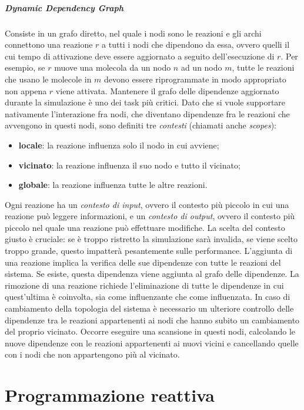 \documentclass[12pt,a4paper,openright,twoside]{book}
\begin{document}
\paragraph{Dynamic Dependency Graph}
Consiste in un grafo diretto, nel quale i nodi sono le reazioni e gli archi connettono una reazione $r$ a tutti i nodi che dipendono da essa, ovvero quelli il cui tempo di attivazione deve essere aggiornato a seguito dell'esecuzione di $r$. Per esempio, se $r$ muove una molecola da un nodo $n$ ad un nodo $m$, tutte le reazioni che usano le molecole in $m$ devono essere riprogrammate in modo appropriato non appena $r$ viene attivata.
Mantenere il grafo delle dipendenze aggiornato durante la simulazione è uno dei task più critici. Dato che si vuole supportare nativamente l'interazione fra nodi, che diventano dipendenze fra le reazioni che avvengono in questi nodi, sono definiti tre \textit{contesti} (chiamati anche \textit{scopes}): 
\begin{itemize}
    \item \textbf{locale}: la reazione influenza solo il nodo in cui avviene; 
    \item \textbf{vicinato}: la reazione influenza il suo nodo e tutto il vicinato; 
    \item \textbf{globale}: la reazione influenza tutte le altre reazioni. 
\end{itemize}
Ogni reazione ha un \textit{contesto di input}, ovvero il contesto più piccolo in cui una reazione può leggere informazioni, e un \textit{contesto di output}, ovvero il contesto più piccolo nel quale una reazione può effettuare modifiche. 
La scelta del contesto giusto è cruciale: se è troppo ristretto la simulazione sarà invalida, se viene scelto troppo grande, questo impatterà pesantemente sulle performance. 
L'aggiunta di una reazione implica la verifica delle sue dipendenze con tutte le reazioni del sistema. Se esiste, questa dipendenza viene aggiunta al grafo delle dipendenze. La rimozione di una reazione richiede l'eliminazione di tutte le dipendenze in cui quest'ultima è coinvolta, sia come influenzante che come influenzata. 
In caso di cambiamento della topologia del sistema è necessario un ulteriore controllo delle dipendenze tra le reazioni appartenenti ai nodi che hanno subito un cambiamento del proprio vicinato. Occorre eseguire una scansione in questi nodi, calcolando le nuove dipendenze con le reazioni appartenenti ai nuovi vicini e cancellando quelle con i nodi che non appartengono più al vicinato. 

\chapter{Programmazione reattiva}
\end{document}

